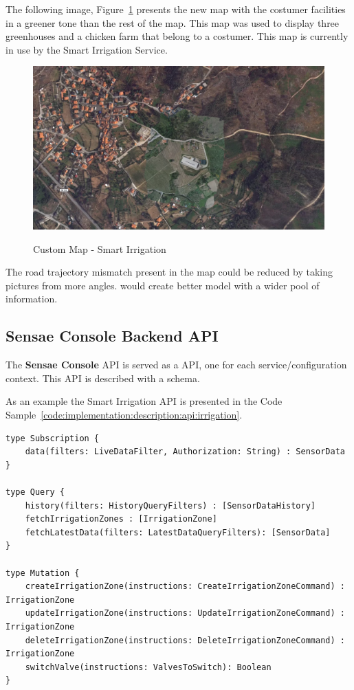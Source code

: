 The following image, Figure~\ref{fig:implementation:description:maps:irrig} presents the new map with the costumer facilities in a greener tone than the rest of the map. This map was used to display three greenhouses and a chicken farm that belong to a costumer. This map is currently in use by the Smart Irrigation Service.

\begin{figure}[H]
    \centering
    \resizebox{\columnwidth}{!}
    {
       \includegraphics{assets/figures/maps/custom-map.png}
    }
    \caption[Custom Map - Smart Irrigation]{Custom Map - Smart Irrigation}
    \label{fig:implementation:description:maps:irrig}
\end{figure}

The road trajectory mismatch present in the map could be reduced by taking pictures from more angles.  would create better model with a wider pool of information.

\subsection{Sensae Console Backend API}
\label{subsec:implementation:description:api}

The \textbf{Sensae Console} \gls{API} is served as a  \gls{API}, one for each service/configuration context. This \gls{API} is described with a schema.

As an example the Smart Irrigation API is presented in the Code Sample~\ref{code:implementation:description:api:irrigation}.

\begin{lstlisting}[caption=Smart Irrigation API Schema, label={code:implementation:description:api:irrigation}]
type Subscription {
    data(filters: LiveDataFilter, Authorization: String) : SensorData
}

type Query {
    history(filters: HistoryQueryFilters) : [SensorDataHistory]
    fetchIrrigationZones : [IrrigationZone]
    fetchLatestData(filters: LatestDataQueryFilters): [SensorData]
}

type Mutation {
    createIrrigationZone(instructions: CreateIrrigationZoneCommand) : IrrigationZone
    updateIrrigationZone(instructions: UpdateIrrigationZoneCommand) : IrrigationZone
    deleteIrrigationZone(instructions: DeleteIrrigationZoneCommand) : IrrigationZone
    switchValve(instructions: ValvesToSwitch): Boolean
}
\end{lstlisting}


